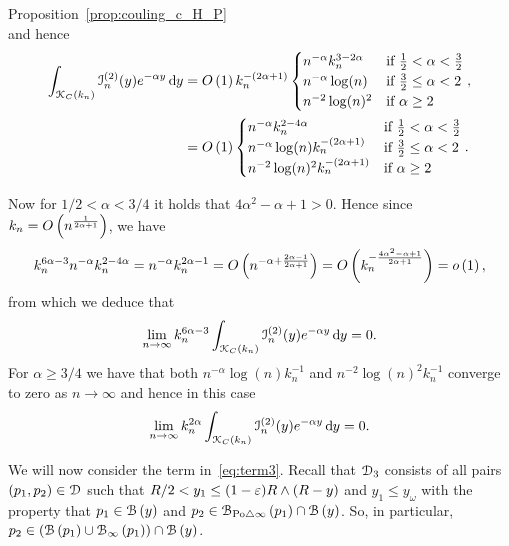 \begin{proofof}{Proposition~\ref{prop:couling_c_H_P}}
\[\]
and hence
\begin{align*}
	\int_{{\mathcal K}_{C}(k_n)} \mathcal{I}_n^{(2)}(y) e^{-\alpha y} \operatorname{\mathrm{d}\hspace{-2pt}} y
	&= O\left(1\right) k_n^{-(2\alpha + 1)}\begin{cases}
				n^{-\alpha} k_n^{3 - 2\alpha} &\mbox{if } \frac{1}{2} < \alpha < \frac{3}{2}\\
				n^{-\alpha} \log(n) &\mbox{if } \frac{3}{2} \le \alpha < 2\\
				n^{-2} \log(n)^{2} &\mbox{if } \alpha \ge 2
		\end{cases},	\\
	&= O\left(1\right) \begin{cases}
				n^{-\alpha} k_n^{2 - 4\alpha} &\mbox{if } \frac{1}{2} < \alpha < \frac{3}{2}\\
				n^{-\alpha} \log(n)k_n^{-(2\alpha + 1)} &\mbox{if } \frac{3}{2} \le \alpha < 2\\
				n^{-2} \log(n)^{2} k_n^{-(2\alpha + 1)} &\mbox{if } \alpha \ge 2
		\end{cases}.
\end{align*}

Now for $1/2 < \alpha < 3/4$ it holds that $4\alpha^2 - \alpha + 1 > 0$. Hence since $k_n = O\left(n^{\frac{1}{2\alpha + 1}}\right)$, we have
\[
	k_n^{6\alpha - 3} n^{-\alpha} k_n^{2 - 4\alpha} = n^{-\alpha} k_n^{2\alpha - 1} = O\left(n^{-\alpha + \frac{2\alpha - 1}{2\alpha + 1}}\right) = O\left(k_n^{-\frac{4\alpha^2 - \alpha + 1}{2\alpha + 1}}\right) = o\left(1\right),
\]
from which we deduce that
\[
	\lim_{n \to \infty} k_n^{6\alpha - 3} \int_{{\mathcal K}_{C}(k_n)} \mathcal{I}_n^{(2)}(y)
	e^{-\alpha y} \operatorname{\mathrm{d}\hspace{-2pt}} y = 0.
\]
For $\alpha \ge 3/4$ we have that both $n^{-\alpha} \log(n) k_n^{-1}$ and $n^{-2} \log(n)^2 k_n^{-1}$ converge to zero as $n \to \infty$ and hence in this case
\[
	\lim_{n \to \infty} k_n^{2\alpha} \int_{{\mathcal K}_{C}(k_n)} \mathcal{I}_n^{(2)}(y)
	e^{-\alpha y} \operatorname{\mathrm{d}\hspace{-2pt}} y = 0.
\]

We will now consider the term in~\eqref{eq:term3}. 
Recall that $\mathcal{D}_{3}$ consists of all pairs $(p_1, p_2 ) \in \mathcal{D}_{}$ such that $R/2 < y_1 \leq (1-\varepsilon)R \wedge (R-y)$ and $y_1 \leq y_\omega$ with the property that 
$p_1 \in {\mathcal B}\left(y\right)$ and $p_2 \in {\mathcal B}_{{\mathrm{Po}} \bigtriangleup \infty}\left(p_1\right) \cap {\mathcal B}\left(y\right)$.    
So, in particular, $p_2 \in ({\mathcal B}\left(p_1\right) \cup {\mathcal B}_{\infty}\left(p_1\right)) \cap {\mathcal B}\left(y\right)$.


\end{proofof}

